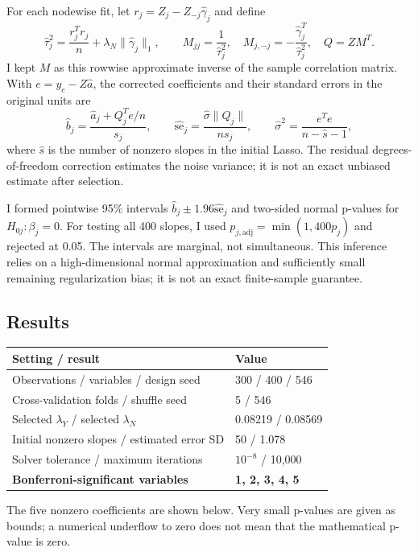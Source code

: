 \documentclass[11pt]{article}
\begin{document}
For each nodewise fit, let $r_j=Z_j-Z_{-j}\hat\gamma_j$ and define
\[
\hat\tau_j^2=\frac{r_j^Tr_j}{n}+\lambda_N\|\hat\gamma_j\|_1,
\qquad
M_{jj}=\frac{1}{\hat\tau_j^2},\quad
M_{j,-j}=-\frac{\hat\gamma_j^T}{\hat\tau_j^2},\quad Q=ZM^T.
\]
I kept $M$ as this rowwise approximate inverse of the sample correlation matrix. With
$e=y_c-Z\hat a$, the corrected coefficients and their standard errors in the original units are
\[
\hat b_j=\frac{\hat a_j+Q_j^Te/n}{s_j},
\qquad
\widehat{\mathrm{se}}_j=\frac{\hat\sigma\|Q_j\|}{ns_j},
\qquad
\hat\sigma^2=\frac{e^Te}{n-\hat s-1},
\]
where $\hat s$ is the number of nonzero slopes in the initial Lasso. The residual degrees-of-freedom
correction estimates the noise variance; it is not an exact unbiased estimate after selection.

I formed pointwise 95\% intervals $\hat b_j\pm1.96\widehat{\mathrm{se}}_j$ and two-sided normal p-values
for $H_{0j}:\beta_j=0$. For testing all 400 slopes, I used
$p_{j,\mathrm{adj}}=\min(1,400p_j)$ and rejected at 0.05. The intervals are marginal, not simultaneous.
This inference relies on a high-dimensional normal approximation and sufficiently small remaining
regularization bias; it is not an exact finite-sample guarantee.

\newpage
\subsection*{Results}

\begin{center}
\begin{tabular}{p{}p{}}
\toprule
\textbf{Setting / result} & \textbf{Value} \\
\midrule
Observations / variables / design seed & 300 / 400 / 546 \\
Cross-validation folds / shuffle seed & 5 / 546 \\
Selected $\lambda_Y$ / selected $\lambda_N$ & 0.08219 / 0.08569 \\
Initial nonzero slopes / estimated error SD & 50 / 1.078 \\
Solver tolerance / maximum iterations & $10^{-8}$ / 10,000 \\
\textbf{Bonferroni-significant variables} & \textbf{1, 2, 3, 4, 5} \\
\bottomrule
\end{tabular}
\end{center}

The five nonzero coefficients are shown below. Very small p-values are given as bounds; a numerical
underflow to zero does not mean that the mathematical p-value is zero.
\end{document}
